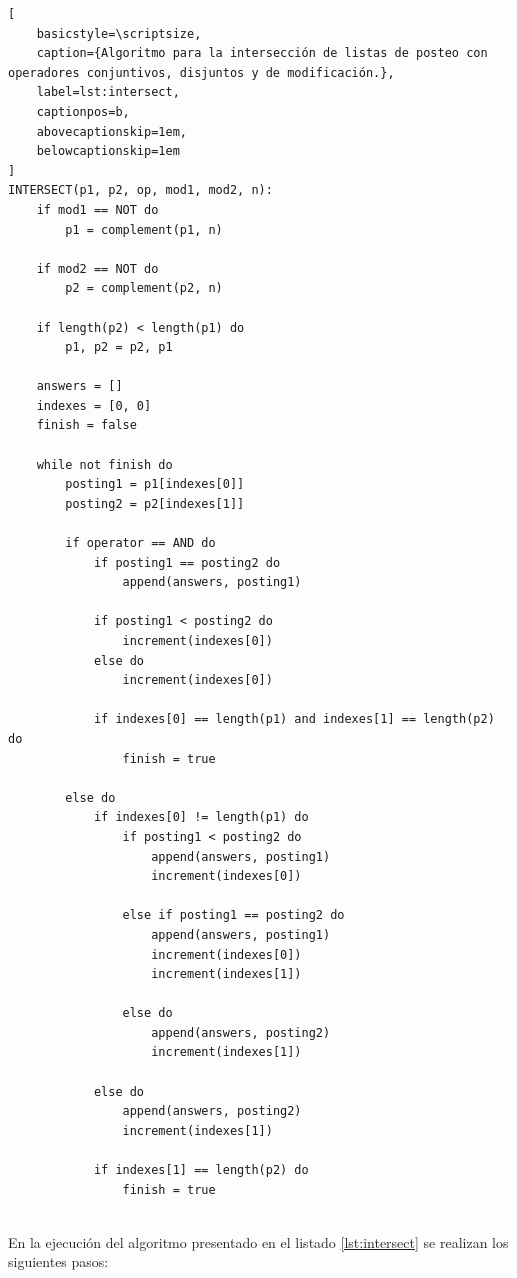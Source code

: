 \begin{lstlisting}[
    basicstyle=\scriptsize,
    caption={Algoritmo para la intersección de listas de posteo con operadores conjuntivos, disjuntos y de modificación.}, 
    label=lst:intersect, 
    captionpos=b,
    abovecaptionskip=1em,
    belowcaptionskip=1em
]
INTERSECT(p1, p2, op, mod1, mod2, n):
    if mod1 == NOT do
        p1 = complement(p1, n)
    
    if mod2 == NOT do
        p2 = complement(p2, n)
        
    if length(p2) < length(p1) do
        p1, p2 = p2, p1
        
    answers = []
    indexes = [0, 0]
    finish = false
    
    while not finish do
        posting1 = p1[indexes[0]]
        posting2 = p2[indexes[1]]
    
        if operator == AND do
            if posting1 == posting2 do
                append(answers, posting1)
                
            if posting1 < posting2 do
                increment(indexes[0])
            else do
                increment(indexes[0])
                
            if indexes[0] == length(p1) and indexes[1] == length(p2) do
                finish = true
        
        else do
            if indexes[0] != length(p1) do
                if posting1 < posting2 do
                    append(answers, posting1)
                    increment(indexes[0])
                
                else if posting1 == posting2 do
                    append(answers, posting1)
                    increment(indexes[0])
                    increment(indexes[1])
                    
                else do
                    append(answers, posting2)
                    increment(indexes[1])
                    
            else do
                append(answers, posting2)
                increment(indexes[1])
                
            if indexes[1] == length(p2) do
                finish = true
        
\end{lstlisting}

En la ejecución del algoritmo presentado en el listado \ref{lst:intersect} se realizan los siguientes pasos:

